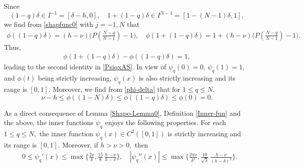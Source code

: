 \documentclass[10pt,reqno,final]{amsart}
\theoremstyle{remark}
\theoremstyle{definition}
\newcommand{\wll}[1]{#1}
\begin{document}
\wll{Since 
$$(1-q)\delta\in I^{-1}=[\delta-h,0],\quad 1+(1-q)\delta\in I^{N-1}=[1-(N-1)\delta,1],$$  we find from \eqref{shapfunc0} with $j=-1,N$ that 
\begin{equation}\label{phi-delta}
\begin{split}
  \phi((1-q)\delta)=(h-\nu)\big(P(\tfrac{N-q}{N-1})-1\big),\quad  \phi(1+(1-q)\delta)=1+(h-\nu)\big(P(\tfrac{N-q}{N-1})-1\big).
  \end{split}
  \end{equation}
Thus, 
\begin{equation}\label{phi-delta-1}
\begin{split}
  \phi(1+(1-q)\delta)-\phi((1-q)\delta)=1,
  \end{split}
  \end{equation}
   leading to the second identity in \eqref{PsiqxAS}.} 
In view of $\psi_q(0)=0,\,\psi_q(1)=1,$ and   $\phi(t)$ \wll{being}  strictly increasing, $\psi_q(x)$ is also strictly increasing and 
its range is  $[0,1].$ 
Moreover,  we find from  \eqref{phi-delta} that for $1\le q\le N,$
  \begin{equation}\label{phiqibnd}
     \nu-h\le \phi((1-N)\delta) \le \phi((1-q)\delta)\le \phi(0)=0.
  \end{equation}

As a direct consequence of Lemma \ref{Shape-Lemma0}, Definition \ref{Inner-fun}   and the above,  the inner functions
$\psi_q$ enjoys the following properties. 
For each $1\le q\le N,$ the inner function $\psi_q(x)\in C^2([0,1])$ is strictly increasing 
and its range is $[0,1].$ Moreover, 
if $h> \nu>0,$ then 
\begin{equation}\label{innerA00}
\begin{split}
& 0\le \psi_q'(x)\le \max\Big\{ 
\frac {2\nu}{\delta}, \frac{15}{8}\,\frac{
   h-\nu}{h-\delta}\Big\},\quad  |\psi_q''(x)|\le \max\Big\{ 
\frac {2\pi\nu}{\delta^{2}}, \frac{10}{\sqrt{3}}\,\frac{h-\nu}{(h-\delta)^2} \Big\}.
\end{split}
\end{equation}
\end{document}
